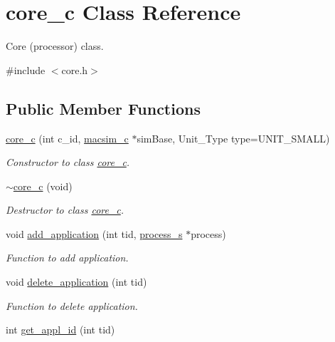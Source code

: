 \hypertarget{classcore__c}{
\section{core\_\-c Class Reference}
\label{classcore__c}
}


Core (processor) class.  




{\ttfamily \#include $<$core.h$>$}

\subsection*{Public Member Functions}
\begin{DoxyCompactItemize}
\item 
\hyperlink{classcore__c_a5717985a54e30ee9919ded4f6fcd229f}{core\_\-c} (int c\_\-id, \hyperlink{classmacsim__c}{macsim\_\-c} $\ast$simBase, Unit\_\-Type type=UNIT\_\-SMALL)
\begin{DoxyCompactList}\small\item\em Constructor to class \hyperlink{classcore__c}{core\_\-c}. \item\end{DoxyCompactList}\item 
\hyperlink{classcore__c_ac572666d1ca4db62d96a97e5afc1410d}{$\sim$core\_\-c} (void)
\begin{DoxyCompactList}\small\item\em Destructor to class \hyperlink{classcore__c}{core\_\-c}. \item\end{DoxyCompactList}\item 
void \hyperlink{classcore__c_a4ca6afe9489a936c43775a613538593e}{add\_\-application} (int tid, \hyperlink{structprocess__s}{process\_\-s} $\ast$process)
\begin{DoxyCompactList}\small\item\em Function to add application. \item\end{DoxyCompactList}\item 
void \hyperlink{classcore__c_a3d7dc29a9e6c41a4f919c88c2891e52f}{delete\_\-application} (int tid)
\begin{DoxyCompactList}\small\item\em Function to delete application. \item\end{DoxyCompactList}\item 
int \hyperlink{classcore__c_a5779e2f06bcb737c75ce2cbdfb7fbea2}{get\_\-appl\_\-id} (int tid)

\end{DoxyCompactItemize}
